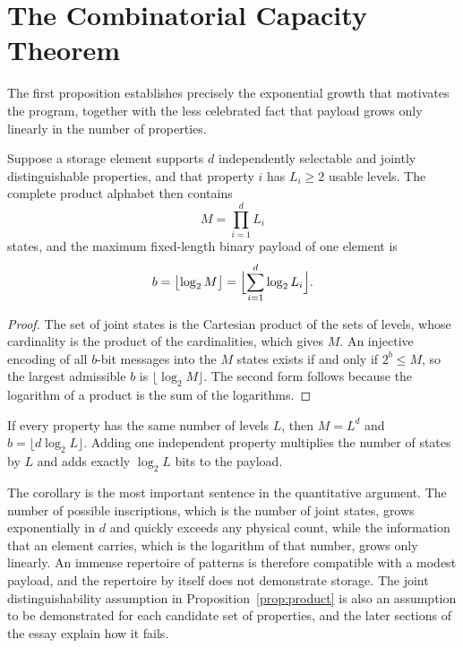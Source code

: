 \section{The Combinatorial Capacity Theorem}\label{sec:capacity}

The first proposition establishes precisely the exponential growth that motivates the program, together with the less celebrated fact that payload grows only linearly in the number of properties.

\begin{proposition}\label{prop:product}
Suppose a storage element supports $d$ independently selectable and jointly distinguishable properties, and that property $i$ has $L_i\ge 2$ usable levels. The complete product alphabet then contains
\[
M=\prod_{i=1}^{d}L_i
\]
states, and the maximum fixed-length binary payload of one element is
\[
b=\bigl\lfloor\log_2 M\bigr\rfloor=\Bigl\lfloor\sum_{i=1}^{d}\log_2 L_i\Bigr\rfloor .
\]
\end{proposition}

\begin{proof}
The set of joint states is the Cartesian product of the sets of levels, whose cardinality is the product of the cardinalities, which gives $M$. An injective encoding of all $b$-bit messages into the $M$ states exists if and only if $2^b\le M$, so the largest admissible $b$ is $\lfloor\log_2 M\rfloor$. The second form follows because the logarithm of a product is the sum of the logarithms.
\end{proof}

\begin{corollary}\label{cor:linear}
If every property has the same number of levels $L$, then $M=L^{d}$ and $b=\lfloor d\log_2 L\rfloor$. Adding one independent property multiplies the number of states by $L$ and adds exactly $\log_2 L$ bits to the payload.
\end{corollary}

The corollary is the most important sentence in the quantitative argument. The number of possible inscriptions, which is the number of joint states, grows exponentially in $d$ and quickly exceeds any physical count, while the information that an element carries, which is the logarithm of that number, grows only linearly. An immense repertoire of patterns is therefore compatible with a modest payload, and the repertoire by itself does not demonstrate storage. The joint distinguishability assumption in Proposition~\ref{prop:product} is also an assumption to be demonstrated for each candidate set of properties, and the later sections of the essay explain how it fails.

